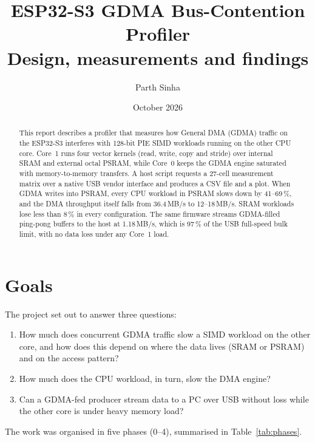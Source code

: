 \documentclass[11pt,a4paper]{article}
\title{\textbf{ESP32-S3 GDMA Bus-Contention Profiler}\\[4pt]
       \large Design, measurements and findings}
\author{Parth Sinha}
\date{October 2026}
\begin{document}
\maketitle

\begin{abstract}
\noindent This report describes a profiler that measures how General DMA (GDMA) traffic on the
ESP32-S3 interferes with 128-bit PIE SIMD workloads running on the other CPU core. Core~1 runs four
vector kernels (read, write, copy and stride) over internal SRAM and external octal PSRAM, while
Core~0 keeps the GDMA engine saturated with memory-to-memory transfers. A host script requests a
27-cell measurement matrix over a native USB vendor interface and produces a CSV file and a plot.
When GDMA writes into PSRAM, every CPU workload in PSRAM slows down by 41--69\,\%, and the DMA
throughput itself falls from 36.4\,MB/s to 12--18\,MB/s. SRAM workloads lose less than 8\,\% in every
configuration. The same firmware streams GDMA-filled ping-pong buffers to the host at 1.18\,MB/s,
which is 97\,\% of the USB full-speed bulk limit, with no data loss under any Core~1 load.
\end{abstract}

\tableofcontents
\newpage

\section{Goals}
The project set out to answer three questions:
\begin{enumerate}
  \item How much does concurrent GDMA traffic slow a SIMD workload on the other core, and how does
        this depend on where the data lives (SRAM or PSRAM) and on the access pattern?
  \item How much does the CPU workload, in turn, slow the DMA engine?
  \item Can a GDMA-fed producer stream data to a PC over USB without loss while the other core is
        under heavy memory load?
\end{enumerate}
The work was organised in five phases (0--4), summarised in Table~\ref{tab:phases}.
\end{document}

